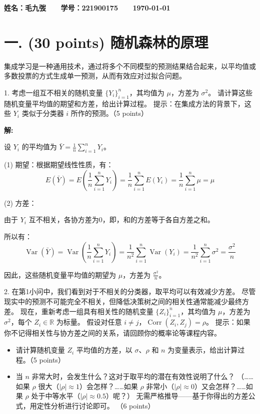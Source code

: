 \documentclass[8pt]{article}
\begin{document}
\textbf{\color{blue} \Large 姓名：毛九弢 \ \ \ 学号：221900175 \ \ \ \today}


\section*{一. (30 points) 随机森林的原理}

集成学习是一种通用技术，通过将多个不同模型的预测结果结合起来，以平均值或多数投票的方式生成单一预测，从而有效应对过拟合问题。


1. 考虑一组互不相关的随机变量 $\{Y_i\}_{i=1}^n$，其均值为 $\mu$，方差为 $\sigma^2$。  
请计算这些随机变量平均值的期望和方差，给出计算过程。  
提示：在集成方法的背景下，这些 $Y_i$ 类似于分类器 $i$ 所作的预测。（5 points）

\textbf{\large 解:}

设 $Y_i$ 的平均值为 $\bar{Y} = \frac{1}{n} \sum_{i=1}^n Y_i$。

(1) 期望：根据期望线性性质，有：
\[
E(\bar{Y}) = E\left(\frac{1}{n} \sum_{i=1}^n Y_i\right) = \frac{1}{n} \sum_{i=1}^n E(Y_i) = \frac{1}{n} \sum_{i=1}^n \mu = \mu
\]

(2) 方差：

由于 $Y_i$ 互不相关，各协方差为0，即，和的方差等于各自方差之和。

所以有：
\[
\operatorname{Var}(\bar{Y}) = \operatorname{Var}\left(\frac{1}{n} \sum_{i=1}^n Y_i\right) = \frac{1}{n^2} \sum_{i=1}^n \operatorname{Var}(Y_i) = \frac{1}{n^2} \sum_{i=1}^n \sigma^2 = \frac{\sigma^2}{n}
\]

因此，这些随机变量平均值的期望为 $\mu$，方差为 $\frac{\sigma^2}{n}$。

\vspace{3em}

2. 在第1小问中，我们看到对于不相关的分类器，取平均可以有效减少方差。  
尽管现实中的预测不可能完全不相关，但降低决策树之间的相关性通常能减少最终方差。  
现在，重新考虑一组具有相关性的随机变量 $\{Z_i\}_{i=1}^n$，其均值为 $\mu$，方差为 $\sigma^2$，每个 $Z_i \in \mathbb{R}$ 为标量。  
假设对任意 $i \neq j$，$\operatorname{Corr}(Z_i, Z_j) = \rho$。  
提示：如果你不记得相关性与协方差之间的关系，请回顾你的概率论等课程内容。 
\begin{itemize}
\item
请计算随机变量 $Z_i$ 平均值的方差，以 $\sigma$、$\rho$ 和 $n$ 为变量表示，给出计算过程。（5 points）  
\item
当 $n$ 非常大时，会发生什么？这对于取平均的潜在有效性说明了什么？  
（……如果 $\rho$ 很大（$| \rho | \approx 1$）会怎样？……如果 $\rho$ 非常小（$|\rho| \approx 0$）又会怎样？……如果 $\rho$ 处于中等水平（$|\rho| \approx 0.5$）呢？）  
无需严格推导——基于你得出的方差公式，用定性分析进行讨论即可。 （6 points）
\end{itemize}
\end{document}
